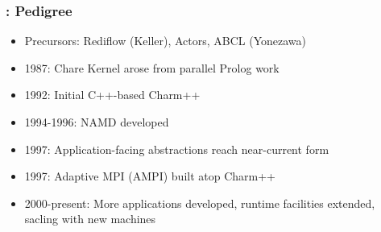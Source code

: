 \begin{frame}
{}
\end{frame}

\begin{frame}
\frametitle{\charm: Pedigree}
\begin{itemize}
\item Precursors: Rediflow (Keller), Actors, ABCL (Yonezawa)
\item 1987: Chare Kernel arose from parallel Prolog work
\item 1992: Initial C++-based Charm++
\item 1994-1996: NAMD developed
\item 1997: Application-facing abstractions reach near-current form
\item 1997: Adaptive MPI (AMPI) built atop Charm++
\item 2000-present: More applications developed, runtime facilities extended,
  sacling with new machines
\end{itemize}
\end{frame}
